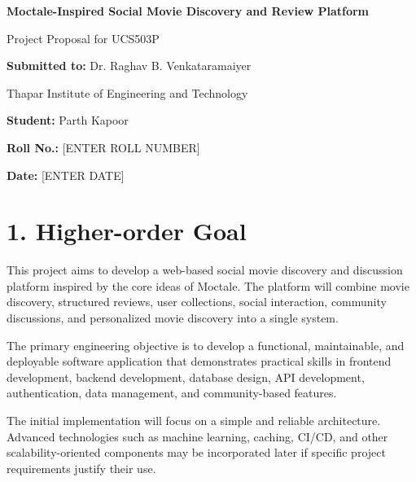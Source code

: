 \documentclass[11pt,a4paper]{article}
\begin{document}

\begin{center}

{\Large \textbf{Moctale-Inspired Social Movie Discovery and Review Platform}}

\vspace{6pt}

{\normalsize Project Proposal for UCS503P}

\vspace{10pt}

\textbf{Submitted to:} Dr. Raghav B. Venkataramaiyer

Thapar Institute of Engineering and Technology

\vspace{8pt}

\textbf{Student:} Parth Kapoor

\textbf{Roll No.:} [ENTER ROLL NUMBER]

\textbf{Date:} [ENTER DATE]

\end{center}



\section{1. Higher-order Goal}

This project aims to develop a web-based social movie discovery and discussion platform inspired by the core ideas of Moctale. The platform will combine movie discovery, structured reviews, user collections, social interaction, community discussions, and personalized movie discovery into a single system.

The primary engineering objective is to develop a functional, maintainable, and deployable software application that demonstrates practical skills in frontend development, backend development, database design, API development, authentication, data management, and community-based features.

The initial implementation will focus on a simple and reliable architecture. Advanced technologies such as machine learning, caching, CI/CD, and other scalability-oriented components may be incorporated later if specific project requirements justify their use.
\end{document}
